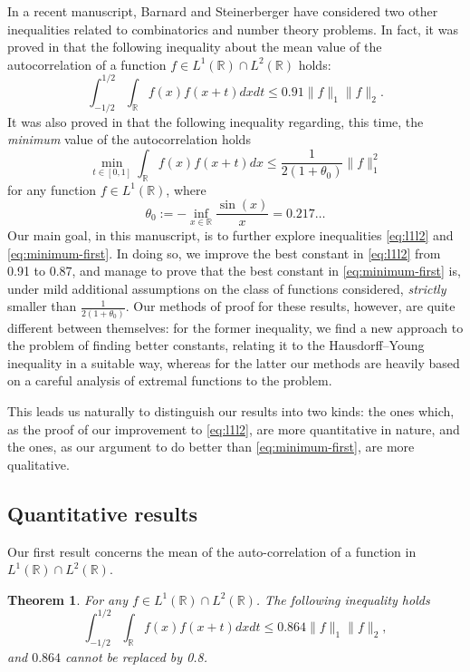 \documentclass[11pt, reqno]{amsart}
\numberwithin{equation}{section}
\newtheorem{theorem}{Theorem}[section]
\newtheorem{remark}[theorem]{Remark}
\newcommand{\R}{{\mathbb R}}
\begin{document}
In a recent manuscript, Barnard and Steinerberger \cite{BarnardSteinerberger} have considered two other inequalities related to combinatorics and number theory problems. In fact, it was proved in \cite{BarnardSteinerberger}
that the following inequality about the mean value of the autocorrelation of a function $f \in L^1(\R) \cap L^2(\R)$ holds:
\begin{equation}\label{eq:l1l2}
\int_{-1/2}^{1/2}\int_{\R}f(x)f(x+t) dx dt\leq 0.91\|f\|_1\|f\|_2.
\end{equation}
It was also proved in \cite{BarnardSteinerberger}
that the following inequality regarding, this time, the \emph{minimum} value of the autocorrelation holds
\begin{equation}\label{eq:minimum-first} 
\min_{t\in{[0,1]}}\int_{\R}f(x)f(x+t) dx \leq
\frac{1}{2(1+\theta_0)}\|f\|^2_1
\end{equation}
for any function $f\in L^{1}(\R)$, where \[
\theta_0 := - \inf_{x\in\R}\frac{\sin(x)}{x} = 0.217\dots 
\]
Our main goal, in this manuscript, is to further explore inequalities \eqref{eq:l1l2} and \eqref{eq:minimum-first}. In doing so, we improve the best constant in \eqref{eq:l1l2} from 0.91 to 0.87, and manage to prove that the best constant in \eqref{eq:minimum-first} is, under mild additional assumptions on the class of functions considered, 
\emph{strictly} smaller than $\frac{1}{2(1+\theta_0)}.$ Our methods of proof for these results, however, are quite different between themselves: for the former inequality, we find a new approach to the problem of finding better constants, relating it to the Hausdorff--Young inequality in a suitable way, whereas for the latter our methods are heavily based on a careful analysis of extremal functions to the problem. 

This leads us naturally to distinguish our results into two kinds: the ones which, as the proof of our improvement to \eqref{eq:l1l2}, are more quantitative in nature, and the ones, as our argument to do better than \eqref{eq:minimum-first}, are more qualitative. 

\subsection{Quantitative results}

Our first result concerns the mean of the auto-correlation of a function in $L^{1}(\R)\cap L^{2}(\R)$.
\begin{theorem}\label{Thm 1}
For any $f\in L^{1}(\R)\cap L^{2}(\R)$. The following inequality holds 
$$
\int_{-1/2}^{1/2}\int_{\R}f(x)f(x+t) dx dt\leq 0.864\|f\|_1\|f\|_2,
$$
and $0.864$ cannot be replaced by 0.8. 
\end{theorem}
\end{document}
